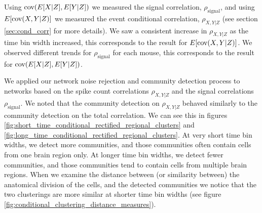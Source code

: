   Using $\text{cov} (E[X|Z], E[Y|Z])$ we measured the signal correlation, $\rho_{\text{signal}}$, and using $E[\text{cov} (X,Y|Z)]$ we measured the event conditional correlation, $\rho_{X,Y|Z}$ (see section \ref{sec:cond_corr} for more details). We saw a consistent increase in $\rho_{X,Y|Z}$ as the time bin width increased, this corresponds to the result for $E[\text{cov}(X,Y|Z)]$. We observed different trends for $\rho_{\text{signal}}$ for each mouse, this corresponds to the result for $\text{cov}(E[X|Z],E[Y|Z])$.

  We applied our network noise rejection and community detection process to networks based on the spike count correlations $\rho_{X,Y|Z}$ and the signal correlations $\rho_{\text{signal}}$. We noted that the community detection on $\rho_{X,Y|Z}$ behaved similarly to the community detection on the total correlation. We can see this  in figures \ref{fig:short_time_conditional_rectified_regional_clusters} and \ref{fig:long_time_conditional_rectified_regional_clusters}. At very short time bin widths, we detect more communities, and those communities often contain cells from one brain region only. At longer time bin widths, we detect fewer communities, and those communities tend to contain cells from multiple brain regions. When we examine the distance between (or similarity between) the anatomical division of the cells, and the detected communities we notice that the two clusterings are more similar at shorter time bin widths (see figure \ref{fig:conditional_clustering_distance_measures}).

